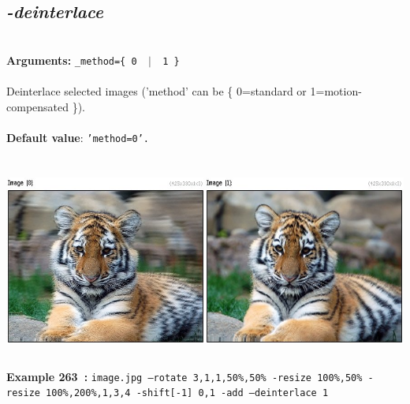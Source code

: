 \documentclass[a4paper,11pt,twoside]{book}
\begin{document}
\subsection{\emph{-deinterlace} }\vspace*{-0.5em}
~\\\textbf{Arguments: } 
{\small \texttt{\_method=\{ 0 ~$|$~ 1 \}}}\\~\\
Deinterlace selected images ('method' can be \{ 0=standard or 1=motion-compensated \}).
~\\~\\\textbf{Default value}: {\small \texttt{'method=0'.}}
\begin{center}\includegraphics[keepaspectratio=true,height=7cm,width=\textwidth]{img/gmic_def263.jpg}\\
{\footnotesize \textbf{Example 263~:} \texttt{image.jpg --rotate 3,1,1,50\%,50\% -resize 100\%,50\% -resize 100\%,200\%,1,3,4 -shift[-1] 0,1 -add --deinterlace 1}}
\end{center}
\end{document}
